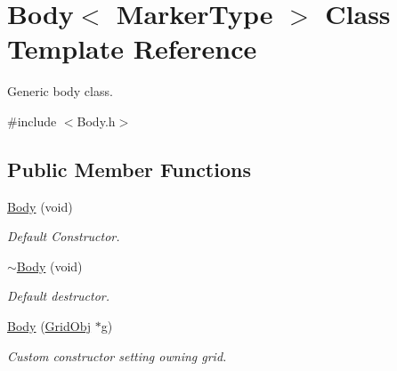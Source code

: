\hypertarget{class_body}{}\section{Body$<$ Marker\+Type $>$ Class Template Reference}
\label{class_body}


Generic body class.  




{\ttfamily \#include $<$Body.\+h$>$}

\subsection*{Public Member Functions}
\begin{DoxyCompactItemize}
\item 
\hyperlink{class_body_a684a431c9215429149f36949ab007353}{Body} (void)
\begin{DoxyCompactList}\small\item\em Default Constructor. \end{DoxyCompactList}\item 
\hyperlink{class_body_a62fb64b91f20eeef2d454994bdbc8b37}{$\sim$\+Body} (void)
\begin{DoxyCompactList}\small\item\em Default destructor. \end{DoxyCompactList}\item 
\hyperlink{class_body_a939c580274ddf89d1a7e8c6b12ea70ca}{Body} (\hyperlink{class_grid_obj}{Grid\+Obj} $\ast$g)
\begin{DoxyCompactList}\small\item\em Custom constructor setting owning grid. \end{DoxyCompactList}\end{DoxyCompactItemize}
